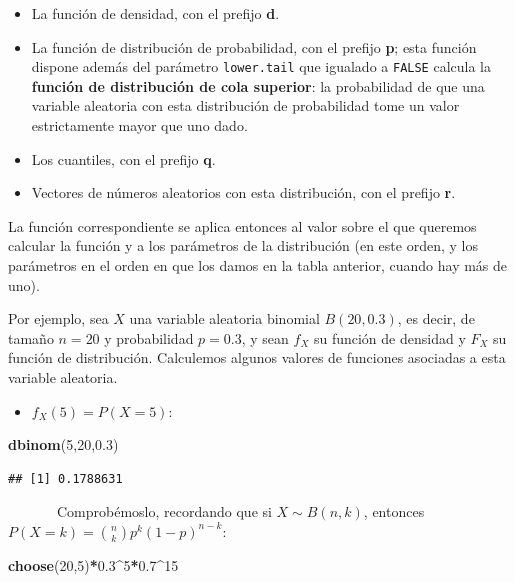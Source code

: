 \documentclass[]{book}
\newenvironment{Shaded}{\begin{snugshade}}{\end{snugshade}}
\newcommand{\DecValTok}[1]{\textcolor[rgb]{0.00,0.00,0.81}{#1}}
\newcommand{\FloatTok}[1]{\textcolor[rgb]{0.00,0.00,0.81}{#1}}
\newcommand{\KeywordTok}[1]{\textcolor[rgb]{0.13,0.29,0.53}{\textbf{#1}}}
\newcommand{\NormalTok}[1]{#1}
\newcommand{\OperatorTok}[1]{\textcolor[rgb]{0.81,0.36,0.00}{\textbf{#1}}}
\providecommand{\tightlist}{%
  \setlength{\itemsep}{0pt}\setlength{\parskip}{0pt}}
\theoremstyle{definition}
\theoremstyle{definition}
\theoremstyle{definition}
\theoremstyle{remark}
\begin{document}
\begin{itemize}
\item
  La función de densidad, con el prefijo \textbf{d}.
\item
  La función de distribución de probabilidad, con el prefijo \textbf{p}; esta función dispone además del parámetro \texttt{lower.tail} que igualado a \texttt{FALSE} calcula la \textbf{función de distribución de cola superior}: la probabilidad de que una variable aleatoria con esta distribución de probabilidad tome un valor estrictamente mayor que uno dado.
\item
  Los cuantiles, con el prefijo \textbf{q}.
\item
  Vectores de números aleatorios con esta distribución, con el prefijo \textbf{r}.
\end{itemize}

La función correspondiente se aplica entonces al valor sobre el que queremos calcular la función y a los parámetros de la distribución (en este orden, y los parámetros en el orden en que los damos en la tabla anterior, cuando hay más de uno).

Por ejemplo, sea \(X\) una variable aleatoria binomial \(B(20,0.3)\), es decir, de tamaño \(n=20\) y probabilidad \(p=0.3\), y sean \(f_X\) su función de densidad y \(F_X\) su función de distribución. Calculemos algunos valores de funciones asociadas a esta variable aleatoria.

\begin{itemize}
\tightlist
\item
  \(f_X(5)=P(X=5)\):
\end{itemize}

\begin{Shaded}
\begin{Highlighting}[]
\KeywordTok{dbinom}\NormalTok{(}\DecValTok{5}\NormalTok{,}\DecValTok{20}\NormalTok{,}\FloatTok{0.3}\NormalTok{)}
\end{Highlighting}
\end{Shaded}

\begin{verbatim}
## [1] 0.1788631
\end{verbatim}

~~~~~~~Comprobémoslo, recordando que si \(X\sim B(n,k)\), entonces \(P(X=k)=\binom{n}{k}p^k(1-p)^{n-k}\):

\begin{Shaded}
\begin{Highlighting}[]
\KeywordTok{choose}\NormalTok{(}\DecValTok{20}\NormalTok{,}\DecValTok{5}\NormalTok{)}\OperatorTok{*}\FloatTok{0.3}\OperatorTok{^}\DecValTok{5}\OperatorTok{*}\FloatTok{0.7}\OperatorTok{^}\DecValTok{15}
\end{Highlighting}
\end{Shaded}
\end{document}

